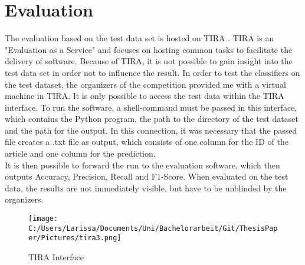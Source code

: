 \documentclass[a4paper, 11pt,titlepage,oneside,openany]{book}
\begin{document}
\chapter{Evaluation}
The evaluation based on the test data set is hosted on TIRA \cite{tira}. TIRA is an "Evaluation as a Service" \cite{evaluationasaservice} and focuses on hosting common tasks to facilitate the delivery of software. Because of TIRA, it is not possible to gain insight into the test data set in order not to influence the result.
In order to test the classifiers on the test dataset, the organizers of the competition provided me with a virtual machine in TIRA. It is only possible to access the test data within the TIRA interface. To run the software, a shell-command must be passed in this interface, which contains the Python program, the path to the directory of the test dataset and the path for the output. In this connection, it was necessary that the passed file creates a .txt file as output, which consists of one column for the ID of the article and one column for the prediction. \\
\indent It is then possible to forward the run to the evaluation software, which then outputs Accuracy, Precision, Recall and F1-Score. When evaluated on the test data, the results are not immediately visible, but have to be unblinded by the organizers. 
\begin{figure}[h]
	\centering
	\texttt{[image: C:/Users/Larissa/Documents/Uni/Bachelorarbeit/Git/ThesisPaper/Pictures/tira3.png]}
	\caption{TIRA Interface}
\end{figure}
\end{document}
